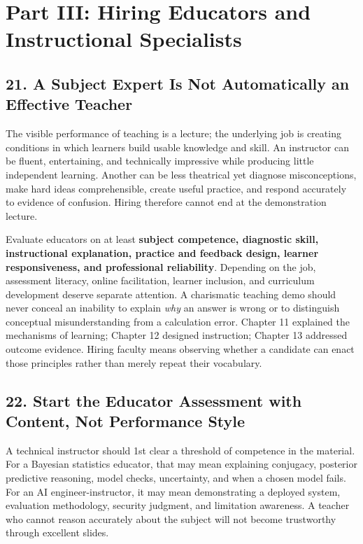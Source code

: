 \section*{Part III: Hiring Educators and Instructional Specialists}

\subsection*{21. A Subject Expert Is Not Automatically an Effective Teacher}

The visible performance of teaching is a lecture; the underlying job is creating conditions in which learners build usable knowledge and skill. An instructor can be fluent, entertaining, and technically impressive while producing little independent learning. Another can be less theatrical yet diagnose misconceptions, make hard ideas comprehensible, create useful practice, and respond accurately to evidence of confusion. Hiring therefore cannot end at the demonstration lecture.

Evaluate educators on at least \textbf{subject competence, diagnostic skill, instructional explanation, practice and feedback design, learner responsiveness, and professional reliability}. Depending on the job, assessment literacy, online facilitation, learner inclusion, and curriculum development deserve separate attention. A charismatic teaching demo should never conceal an inability to explain \textit{why} an answer is wrong or to distinguish conceptual misunderstanding from a calculation error. Chapter 11 explained the mechanisms of learning; Chapter 12 designed instruction; Chapter 13 addressed outcome evidence. Hiring faculty means observing whether a candidate can enact those principles rather than merely repeat their vocabulary.

\subsection*{22. Start the Educator Assessment with Content, Not Performance Style}

A technical instructor should 1st clear a threshold of competence in the material. For a Bayesian statistics educator, that may mean explaining conjugacy, posterior predictive reasoning, model checks, uncertainty, and when a chosen model fails. For an AI engineer-instructor, it may mean demonstrating a deployed system, evaluation methodology, security judgment, and limitation awareness. A teacher who cannot reason accurately about the subject will not become trustworthy through excellent slides.


